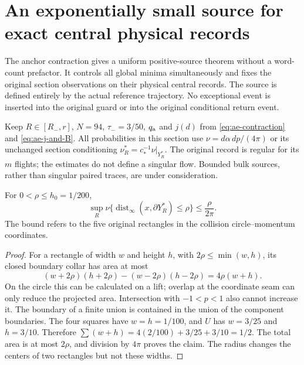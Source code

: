 \section{An exponentially small source for exact central physical records}
\label{sec:ec-exact-source}
The anchor contraction gives a uniform positive-source theorem
without a word-count prefactor.  It controls all global minima
simultaneously and fixes the original section observations on their
physical central records.  The source is defined entirely by the
actual reference trajectory.  No exceptional event is inserted into
the original guard or into the original conditional return event.

Keep $R\in[R_-,r]$, $N=94$, $\tau_-=3/50$,
$q_{\rm a}$ and $j(d)$ from \eqref{eq:ae-contraction} and
\eqref{eq:ae-j-and-B}.  All probabilities in this section use
$\nu=d\alpha\,dp/(4\pi)$ or its unchanged section conditioning
$\nu_R^*=c_*^{-1}\nu|_{Y_R^*}$.  The original record is regular
for its $m$ flights; the estimates do not define a singular flow.
Bounded bulk sources, rather than singular paired traces, are under
consideration.

\begin{lemma}
\label{lem:ec-collar}
For $0<\rho\le h_0=1/200$,
\begin{equation}\label{eq:ec-collar}
 \sup_R\nu\{\operatorname{dist}_\infty(x,\partial Y_R^*)\le\rho\}
                                      \le\frac{\rho}{2\pi}.
\end{equation}
The bound refers to the five original rectangles in the collision
circle--momentum coordinates.
\end{lemma}
\begin{proof}
For a rectangle of width $w$ and height $h$, with
$2\rho\le\min(w,h)$, its closed boundary collar has area at most
\[
 (w+2\rho)(h+2\rho)-(w-2\rho)(h-2\rho)
                                      =4\rho(w+h).
\]
On the circle this can be calculated on a lift; overlap at the
coordinate seam can only reduce the projected area.  Intersection
with $-1<p<1$ also cannot increase it.  The boundary of a finite
union is contained in the union of the component boundaries.
The four squares have $w=h=1/100$, and $U$ has $w=3/25$ and
$h=3/10$.  Therefore
$\sum(w+h)=4(2/100)+3/25+3/10=1/2$.  The total area is at most
$2\rho$, and division by $4\pi$ proves the claim.  The radius
changes the centers of two rectangles but not these widths.
\end{proof}

